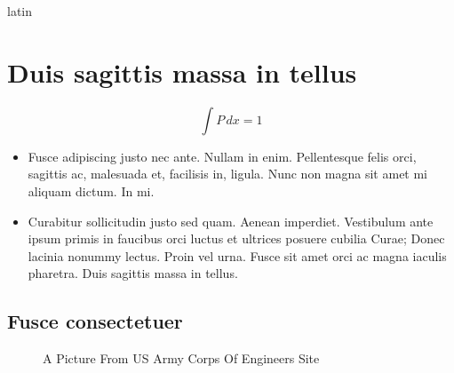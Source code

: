 \documentclass{fidata-report-template}
\begin{document}
\begin{otherlanguage*}{latin}

\lipsum[9]

\chapter{Duis sagittis massa in tellus}

\lipsum[11]

\begin{equation}
  \label{eq:B}
  \int P\,dx =1
\end{equation}

\begin{itemize}
\item Fusce adipiscing justo nec ante. Nullam in enim.
  Pellentesque felis orci, sagittis ac, malesuada et, facilisis in,
  ligula. Nunc non magna sit amet mi aliquam dictum. In mi.
\item Curabitur
  sollicitudin justo sed quam. Aenean imperdiet. Vestibulum ante ipsum
  primis in faucibus orci luctus et ultrices posuere cubilia Curae;
  Donec lacinia nonummy lectus. Proin vel urna. Fusce sit amet orci ac
  magna iaculis pharetra. Duis sagittis massa in tellus.
\end{itemize}

\section{Fusce consectetuer}

\lipsum[10]

\end{otherlanguage*}

\begin{figure}
  \centering
  \caption{A Picture From US Army Corps Of Engineers Site}
  \label{fig:nola}
\end{figure}
\end{document}
